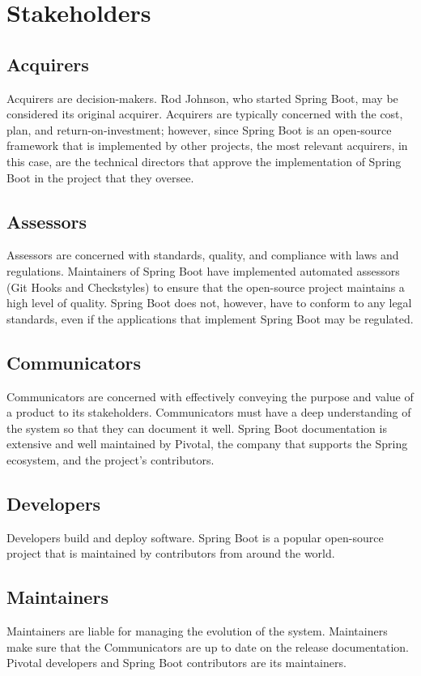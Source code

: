 \section{Stakeholders}
\subsection*{Acquirers}
Acquirers are decision-makers. Rod Johnson, who started Spring Boot, may be considered its original acquirer. Acquirers are typically concerned with the cost, plan, and return-on-investment; however, since Spring Boot is an open-source framework that is implemented by other projects, the most relevant acquirers, in this case, are the technical directors that approve the implementation of Spring Boot in the project that they oversee.

\subsection*{Assessors}
Assessors are concerned with standards, quality, and compliance with laws and regulations. Maintainers of Spring Boot have implemented automated assessors (Git Hooks and Checkstyles) to ensure that the open-source project maintains a high level of quality. Spring Boot does not, however, have to conform to any legal standards, even if the applications that implement Spring Boot may be regulated.

\subsection*{Communicators}
Communicators are concerned with effectively conveying the purpose and value of a product to its stakeholders. Communicators must have a deep understanding of the system so that they can document it well. Spring Boot documentation is extensive and well maintained by Pivotal, the company that supports the Spring ecosystem, and the project's contributors.

\subsection*{Developers} 
Developers build and deploy software. Spring Boot is a popular open-source project that is maintained by contributors from around the world.

\subsection*{Maintainers}
Maintainers are liable for managing the evolution of the system. Maintainers make sure that the Communicators are up to date on the release documentation. Pivotal developers and Spring Boot contributors are its maintainers.

